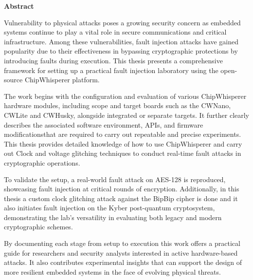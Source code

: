\cleardoublepage
{}
{}
\thispagestyle{empty}
\textbf{\hspace{0pt plus 1filll}\huge Abstract}
\vspace{15mm}

    Vulnerability to physical attacks poses a growing security concern as embedded systems continue to play a vital role in secure communications and critical infrastructure. Among these  vulnerabilities, fault injection attacks have gained popularity due to their effectiveness in bypassing cryptographic protections by introducing faults during execution. This thesis presents a comprehensive framework for setting up a practical fault injection laboratory using the open-source ChipWhisperer platform.
    
    The work begins with the configuration and evaluation of various ChipWhisperer hardware modules, including scope and target boards such as the CWNano, CWLite and CWHusky, alongside integrated or separate targets. It further clearly describes the associated software environment, APIs, and firmware modificationsthat are required to carry out repeatable and precise experiments. This thesis provides detailed knowledge of how to use  ChipWhisperer and carry out Clock and voltage glitching techniques to conduct real-time fault attacks in cryptographic operations.
    

    To validate the setup, a real-world fault attack on AES-128 is reproduced, showcasing fault injection at critical rounds of encryption. Additionally, in this thesis a custom clock glitching attack against the BipBip cipher is done and it also initiates fault injection on the Kyber post-quantum cryptosystem, demonstrating the lab's versatility in evaluating both legacy and modern cryptographic schemes.

    By documenting each stage from setup to execution this work offers a practical guide for researchers and security analysts interested in active hardware-based attacks. It also contributes experimental insights that can support the design of more resilient embedded systems in the face of evolving physical threats.
    